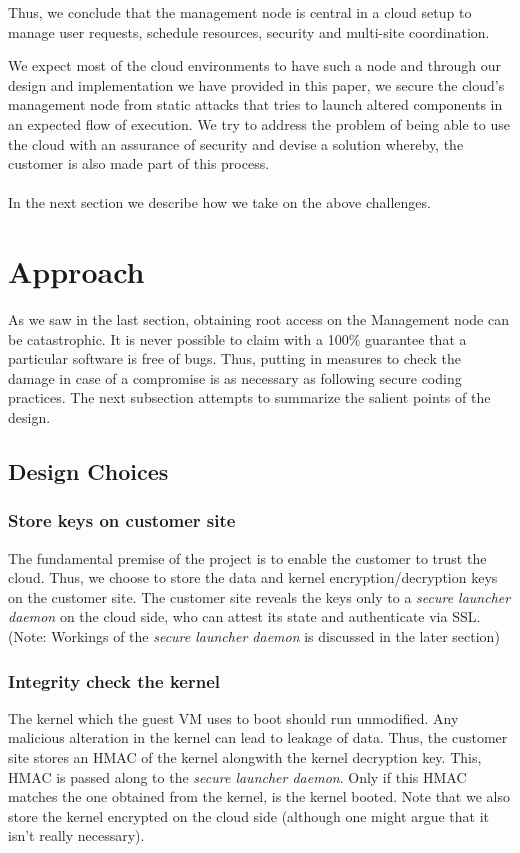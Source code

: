 \documentclass[10pt,twocolumn,pdftex]{article}
\begin{document}
Thus, we conclude that the management node is central in a cloud setup to manage user requests, schedule resources, security and multi-site coordination.

We expect most of the cloud environments to have such a node and through our design and implementation we have provided in this paper, we secure the cloud's management node from static attacks that tries to launch altered components in an expected flow of execution. We try to address the problem of being able to use the cloud with an assurance of security and devise a solution whereby, the customer is also made part of this process.\\\\
In the next section we describe how we take on the above challenges.

\label{sec:problem}

\section{Approach}
\label{sec:approach}
As we saw in the last section, obtaining root access on the Management node can be catastrophic. It is never possible to claim with a 100\% guarantee that a particular software is free of bugs. Thus, putting in measures to check the damage in case of a compromise is as necessary as following secure coding practices. The next subsection attempts to summarize the salient points of the design. 

\subsection{Design Choices}

\subsubsection{Store keys on customer site}
The fundamental premise of the project is to enable the customer to trust the cloud. Thus, we choose to store the data and kernel encryption/decryption keys on the customer site. The customer site reveals the keys only to a \emph{secure launcher daemon} on the cloud side, who can attest its state and authenticate via SSL. (Note: Workings of the \emph{secure launcher daemon} is discussed in the later section)

\subsubsection{Integrity check the kernel}
The kernel which the guest VM uses to boot should run unmodified. Any malicious alteration in the kernel can lead to leakage of data. Thus, the customer site stores an HMAC of the kernel alongwith the kernel decryption key. This, HMAC is passed along to the \emph{secure launcher daemon}. Only if this HMAC matches the one obtained from the kernel, is the kernel booted. Note that we also store the kernel encrypted on the cloud side (although one might argue that it isn't really necessary).
\end{document}
